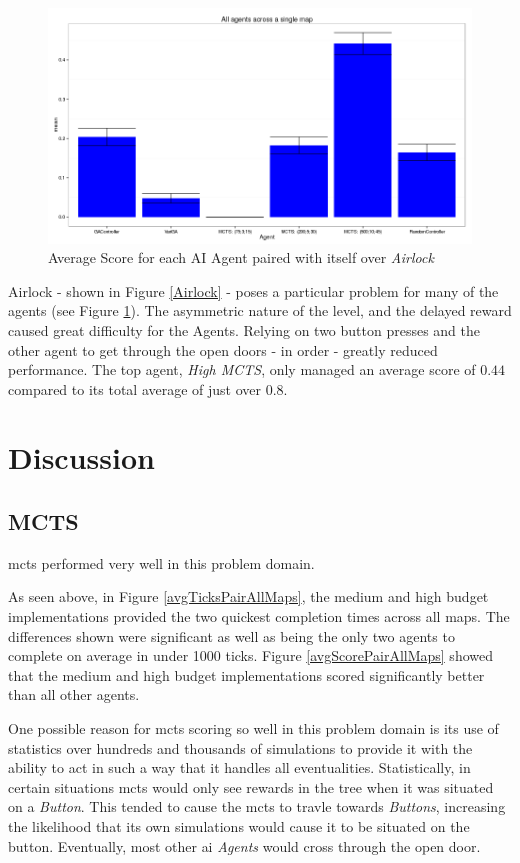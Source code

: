 \documentclass{IEEEtran}
\begin{document}
\begin{figure}[!ht]
\centering
\includegraphics[width = \linewidth]{level5-txt-scores}
\caption{Average Score for each AI Agent paired with itself over \emph{Airlock}}
\label{avgScoreMap5}
\end{figure}

Airlock - shown in Figure \ref{Airlock} - poses a particular problem for many of the agents (see Figure \ref{avgScoreMap5}). The asymmetric nature of the level, and the delayed reward caused great difficulty for the Agents. Relying on two button presses and the other agent to get through the open doors - in order - greatly reduced performance. The top agent, \emph{High MCTS}, only managed an average score of $0.44$ compared to its total average of just over $0.8$.

\section{Discussion}
\subsection{MCTS}
\gls{mcts} performed very well in this problem domain. 

As seen above, in Figure \ref{avgTicksPairAllMaps}, the medium and high budget implementations provided the two quickest completion times across all maps. The differences shown were significant as well as being the only two agents to complete on average in under 1000 ticks.  Figure \ref{avgScorePairAllMaps} showed that the medium and high budget implementations scored significantly better than all other agents.

One possible reason for \gls{mcts} scoring so well in this problem domain is its use of statistics over hundreds and thousands of simulations to provide it with the ability to act in such a way that it handles all eventualities. Statistically,  in certain situations \gls{mcts} would only see rewards in the tree when it was situated on a \emph{Button}. This tended to cause the \gls{mcts} to travle towards \emph{Buttons}, increasing the likelihood that its own simulations would cause it to be situated on the button. Eventually, most other \gls{ai} \emph{Agents} would cross through the open door.
\end{document}
